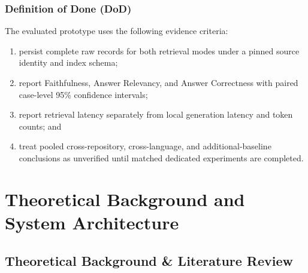 \documentclass[12pt,letterpaper,oneside]{report}
\begin{document}
\subsection{Definition of Done (DoD)}
The evaluated prototype uses the following evidence criteria:
\begin{enumerate}
    \item persist complete raw records for both retrieval modes under a pinned source identity and index schema;
    \item report Faithfulness, Answer Relevancy, and Answer Correctness with paired case-level 95\% confidence intervals;
    \item report retrieval latency separately from local generation latency and token counts; and
    \item treat pooled cross-repository, cross-language, and additional-baseline conclusions as unverified until matched dedicated experiments are completed.
\end{enumerate}

\newpage

\chapter{Theoretical Background and System Architecture}

\section{Theoretical Background \& Literature Review}
\end{document}
